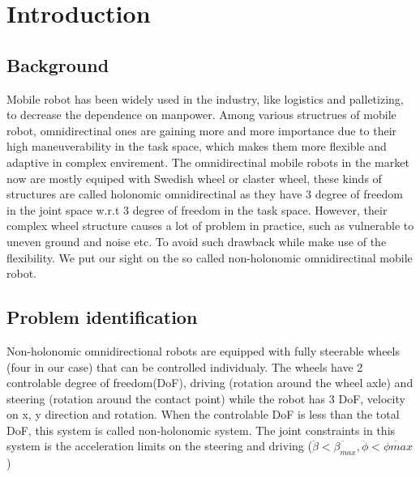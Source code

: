 \chapter{Introduction}
\label{cha:introduction}

\section{Background}
\label{sec:background}
Mobile robot has been widely used in the industry, like logistics and palletizing, to decrease the dependence on manpower. Among various structrues of mobile robot, omnidirectinal ones are gaining more and more 
importance due to their high maneuverability in the task space, which makes them more flexible and adaptive in complex envirement. The omnidirectinal mobile robots in the market now are mostly equiped with 
Swedish wheel or claster wheel, these kinds of structures are called holonomic omnidirectinal as they have 3 degree of freedom in the joint space w.r.t 3 degree of freedom in the task space. However, their complex 
wheel structure causes a lot of problem in practice, such as vulnerable to uneven ground and noise etc. To avoid such drawback while make use of the flexibility. We put our sight on the so called non-holonomic 
omnidirectinal mobile robot. 

\section{Problem identification}
\label{sec:problemIdentification}
Non-holonomic omnidirectional robots are equipped with fully steerable wheels (four in our case) that can be controlled individualy. The wheels have 2 controlable degree of freedom(DoF), driving (rotation around the
wheel axle) and steering (rotation around the contact point) while the robot has 3 DoF, velocity on x, y direction and rotation. When the controlable DoF is less than the total DoF, this system is called non-holonomic
system. The joint constraints in this system is the acceleration limits on the steering and driving ($\ddot{\beta}<\ddot{\beta_{max}}, \ddot{\phi}<\ddot{\phi{max}}$)


